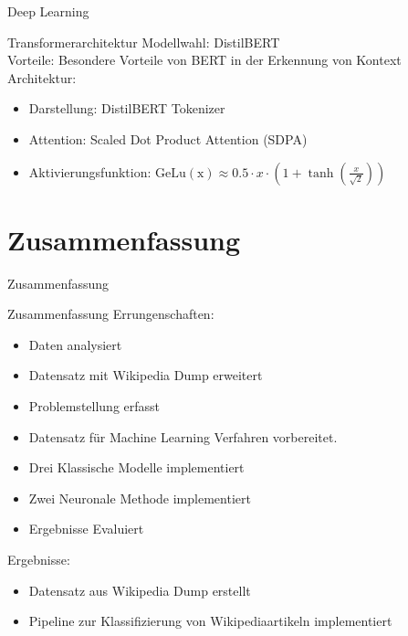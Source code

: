 \documentclass[aspectratio=169]{beamer} %
\begin{document}
\begin{frame}{Deep Learning}
    \begin{block}{Transformerarchitektur}
        Modellwahl: DistilBERT \\
        Vorteile: Besondere Vorteile von BERT in der Erkennung von Kontext \\
        Architektur:
        \begin{itemize}
            \item Darstellung: DistilBERT Tokenizer
            \item Attention: Scaled Dot Product Attention (SDPA)
            \item Aktivierungsfunktion: $\operatorname{GeLu(x)} \approx {0.5 \cdot x \cdot (1+ \tanh({\frac{x}{\sqrt{2}}}))} $
        \end{itemize}
    \end{block}
\end{frame}

\section{Zusammenfassung}

\begin{frame}{Zusammenfassung}
    \begin{block}{Zusammenfassung}
        Errungenschaften:
        \begin{itemize}
            \item Daten analysiert
            \item Datensatz mit Wikipedia Dump erweitert
            \item Problemstellung erfasst
            \item Datensatz für Machine Learning Verfahren vorbereitet.
            \item Drei Klassische Modelle implementiert
            \item Zwei Neuronale Methode implementiert
            \item Ergebnisse Evaluiert
        \end{itemize}
        Ergebnisse:
        \begin{itemize}
            \item Datensatz aus Wikipedia Dump erstellt
            \item Pipeline zur Klassifizierung von Wikipediaartikeln implementiert
        \end{itemize}
    \end{block}
\end{frame}
\end{document}
